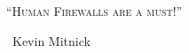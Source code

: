 \documentclass[../../main.tex]{subfiles}
\begin{document}

\thispagestyle{empty}
\centering
\vspace*{10cm}

\large\textsc {"`Human Firewalls are a must!"'}\par
\normalsize\ {Kevin Mitnick}
\end{document}
